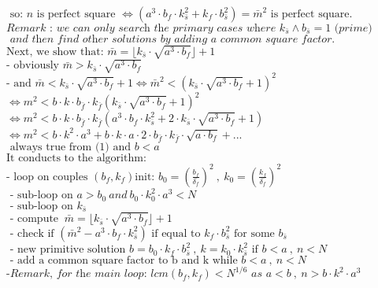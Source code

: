 \documentclass[10pt,a4paper]{letter}
\begin{document}
\begin{flushleft}
$\text{ so: }n \text{ is perfect square } \Leftrightarrow \left(a^{3} \cdot b_{f}\cdot k_{\bar{s}}^{2}  + k_{f}\cdot b_{\bar{s}}^{2} \right)=\bar{m}^{2} \text{ is perfect square.}$ \\
$\textit{Remark : we can only search the primary cases where }k_{\bar{s}}\wedge b_{\bar{s}}=1 \textit{ (prime)} $ \\ 
$\textit{ and then find other solutions by adding a common square factor.} $ \\
$\text{Next, we show that: }  \bar{m}= \lfloor k_{\bar{s}} \cdot \sqrt{a^{3} \cdot b_{f}} \rfloor +1 $ \\
$\text{- obviously } \bar{m}> k_{\bar{s}} \cdot \sqrt{a^{3} \cdot b_{f}} $  \\
$\text{- and } \bar{m}< k_{\bar{s}} \cdot \sqrt{a^{3} \cdot b_{f}}+1 \Leftrightarrow \bar{m}^{2} < \left(k_{\bar{s}} \cdot \sqrt{a^{3} \cdot b_{f}}+1  \right)^{2} $\\ 
$ \Leftrightarrow m^{2} < b \cdot k \cdot b_{\bar{f}}  \cdot k _{\bar{f}} \left(k_{\bar{s}} \cdot \sqrt{a^{3} \cdot b_{f}}+1  \right)^{2} $ \\ 
$ \Leftrightarrow  m^{2} <  b \cdot k \cdot b_{\bar{f}}  \cdot k _{\bar{f}} \left( a^{3} \cdot b_{f}\cdot k_{\bar{s}}^{2} + 2 \cdot k_{\bar{s}} \cdot \sqrt{a^{3} \cdot b_{f}} +1 \right)  $ \\
$ \Leftrightarrow  m^{2} < b \cdot k^{2} \cdot a^{3} + b \cdot k \cdot a \cdot 2 \cdot b_{\bar{f}}  \cdot k _{\bar{f}} \cdot \sqrt{a \cdot b_{f}} + ... $ \\
$\text { always true from (1) and } b < a $ \\
$\text{It conducts to the algorithm:} $ \\
$\text{- loop on couples }  \left(b_{f},k_{f} \right)\text{init: } b_{0}=\left(\frac{b_{f}}{\delta_{f}}\right)^{2}\ , \  k_{0}=\left(\frac{k_{f}}{\delta_{f}}\right)^{2} $ \\
$\text{\ \ - sub-loop on } a > b_{0} \ and \ b_{0} \cdot k_{0}^{2} \cdot a^{3} < N $\\
$\text{\ \ \ \  - sub-loop on } k_{\bar{s}} $ \\
$\text{\ \ \ \ \ \  - compute }\ \bar{m}= \lfloor k_{\bar{s}} \cdot \sqrt{a^{3} \cdot b_{f}} \rfloor +1 \ $\\
$\text{\ \ \ \ \ \ - check\ if\  }\left(\bar{m}^{2}-a^{3} \cdot b_{f}\cdot k_{\bar{s}}^{2}\right) \text{ if equal to }k_{f} \cdot b_{\bar{s}}^{2} \text{ for some } b_{\bar{s}} $\\
$\text{\ \ \ \ \ \ \ \  - new primitive solution }b=b_{0} \cdot k_{f} \cdot b_{\bar{s}}^{2} \ , \ k=k_{0} \cdot k_{\bar{s}}^{2}\text{ if  }b < a \ , \ n<N$ \\
$\text{\ \ \ \ \ \ \ \ \ \  - add a common square factor to b and k while }b < a \ , \ n<N$ \\
$\textit{-Remark, for the main loop: } lcm\left(b_{f},k_{f}\right) < N^{1/6}  
 \textit{ as } a<b \ , \ n>b\cdot k^{2} \cdot a^{3} $
\end{flushleft} 
\end{document}
